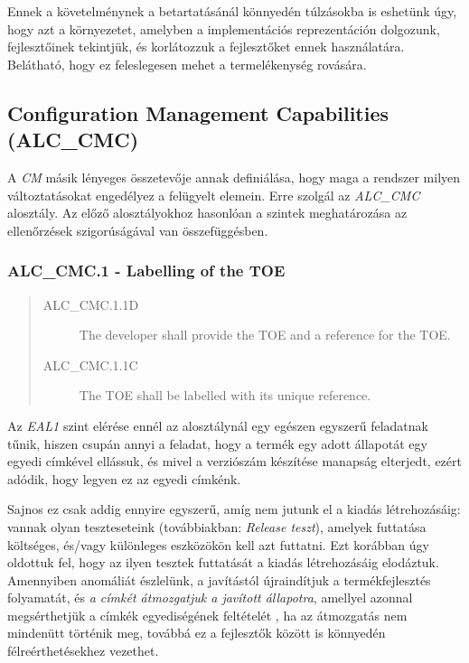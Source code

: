 Ennek a követelménynek a betartatásánál könnyedén túlzásokba is eshetünk úgy, hogy azt
a környezetet, amelyben a implementációs reprezentáción dolgozunk, fejlesztőinek tekintjük, és
korlátozzuk a fejlesztőket ennek használatára. Belátható, hogy ez feleslegesen mehet
a termelékenység rovására.

\pagebreak[3]
\subsection{Configuration Management Capabilities (ALC\_CMC)}

A \emph{CM} másik lényeges összetevője annak definiálása, hogy maga a rendszer milyen
változtatásokat engedélyez a felügyelt elemein. Erre szolgál az \emph{ALC\_CMC} alosztály.
Az előző alosztályokhoz hasonlóan a szintek meghatározása az ellenőrzések szigorúságával van
összefüggésben.

\subsubsection{ALC\_CMC.1 - Labelling of the TOE}
\begin{quote}
    \begin{description}
        \item[ALC\_CMC.1.1D]{The developer shall provide the TOE and a reference for the TOE.}
        \item[ALC\_CMC.1.1C]{The TOE shall be labelled with its unique reference.}
    \end{description}
\end{quote}

Az \emph{EAL1} szint elérése ennél az alosztálynál egy egészen egyszerű feladatnak tűnik, hiszen
csupán annyi a feladat, hogy a termék egy adott állapotát egy egyedi címkével ellássuk, és mivel
a verziószám készítése manapság elterjedt, ezért adódik, hogy legyen ez az egyedi címkénk.

Sajnos ez csak addig ennyire egyszerű, amíg nem jutunk el a kiadás létrehozásáig: vannak olyan
teszteseteink (továbbiakban: \emph{Release teszt}), amelyek futtatása költséges, és/vagy különleges
eszközökön kell azt futtatni. Ezt korábban úgy oldottuk fel, hogy az ilyen tesztek futtatását
a kiadás létrehozásáig elodáztuk.  Amennyiben anomáliát észlelünk, a javítástól újraindítjuk
a termékfejlesztés folyamatát, és \emph{a címkét átmozgatjuk a javított állapotra}, amellyel azonnal
megsérthetjük a címkék egyediségének feltételét , ha az átmozgatás nem mindenütt történik meg,
továbbá ez a fejlesztők között is könnyedén félreérthetésekhez vezethet.

